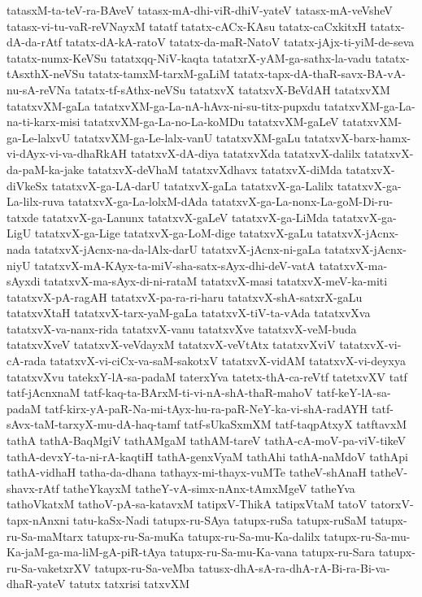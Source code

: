 {tatasxM-ta-teV-ra-BAveV
tatasx-mA-dhi-viR-dhiV-yateV
tatasx-mA-veVsheV
tatasx-vi-tu-vaR-reVNayxM
tatatf
tatatx-cACx-KAsu
tatatx-caCxkitxH
tatatx-dA-da-rAtf
tatatx-dA-kA-ratoV
tatatx-da-maR-NatoV
tatatx-jAjx-ti-yiM-de-seva
tatatx-numx-KeVSu
tatatxqq-NiV-kaqta
tatatxrX-yAM-ga-sathx-la-vadu
tatatx-tAsxthX-neVSu
tatatx-tamxM-tarxM-gaLiM
tatatx-tapx-dA-thaR-savx-BA-vA-nu-sA-reVNa
tatatx-tf-sAthx-neVSu
tatatxvX
tatatxvX-BeVdAH
tatatxvXM
tatatxvXM-gaLa
tatatxvXM-ga-La-nA-hAvx-ni-su-titx-pupxdu
tatatxvXM-ga-La-na-ti-karx-misi
tatatxvXM-ga-La-no-La-koMDu
tatatxvXM-gaLeV
tatatxvXM-ga-Le-lalxvU
tatatxvXM-ga-Le-lalx-vanU
tatatxvXM-gaLu
tatatxvX-barx-hamx-vi-dAyx-vi-va-dhaRkAH
tatatxvX-dA-diya
tatatxvXda
tatatxvX-dalilx
tatatxvX-da-paM-ka-jake
tatatxvX-deVhaM
tatatxvXdhavx
tatatxvX-diMda
tatatxvX-diVkeSx
tatatxvX-ga-LA-darU
tatatxvX-gaLa
tatatxvX-ga-Lalilx
tatatxvX-ga-La-lilx-ruva
tatatxvX-ga-La-lolxM-dAda
tatatxvX-ga-La-nonx-La-goM-Di-ru-tatxde
tatatxvX-ga-Lanunx
tatatxvX-gaLeV
tatatxvX-ga-LiMda
tatatxvX-ga-LigU
tatatxvX-ga-Lige
tatatxvX-ga-LoM-dige
tatatxvX-gaLu
tatatxvX-jAcnx-nada
tatatxvX-jAcnx-na-da-lAlx-darU
tatatxvX-jAcnx-ni-gaLa
tatatxvX-jAcnx-niyU
tatatxvX-mA-KAyx-ta-miV-sha-satx-sAyx-dhi-deV-vatA
tatatxvX-ma-sAyxdi
tatatxvX-ma-sAyx-di-ni-rataM
tatatxvX-masi
tatatxvX-meV-ka-miti
tatatxvX-pA-ragAH
tatatxvX-pa-ra-ri-haru
tatatxvX-shA-satxrX-gaLu
tatatxvXtaH
tatatxvX-tarx-yaM-gaLa
tatatxvX-tiV-ta-vAda
tatatxvXva
tatatxvX-va-nanx-rida
tatatxvX-vanu
tatatxvXve
tatatxvX-veM-buda
tatatxvXveV
tatatxvX-veVdayxM
tatatxvX-veVtAtx
tatatxvXviV
tatatxvX-vi-cA-rada
tatatxvX-vi-ciCx-va-saM-sakotxV
tatatxvX-vidAM
tatatxvX-vi-deyxya
tatatxvXvu
tatekxY-lA-sa-padaM
taterxYva
tatetx-thA-ca-reVtf
tatetxvXV
tatf
tatf-jAcnxnaM
tatf-kaq-ta-BArxM-ti-vi-nA-shA-thaR-mahoV
tatf-keY-lA-sa-padaM
tatf-kirx-yA-paR-Na-mi-tAyx-hu-ra-paR-NeY-ka-vi-shA-radAYH
tatf-sAvx-taM-tarxyX-mu-dA-haq-tamf
tatf-sUkaSxmXM
tatf-taqpAtxyX
tatftavxM
tathA
tathA-BaqMgiV
tathAMgaM
tathAM-tareV
tathA-cA-moV-pa-viV-tikeV
tathA-devxY-ta-ni-rA-kaqtiH
tathA-genxVyaM
tathAhi
tathA-naMdoV
tathApi
tathA-vidhaH
tatha-da-dhana
tathayx-mi-thayx-vuMTe
tatheV-shAnaH
tatheV-shavx-rAtf
tatheYkayxM
tatheY-vA-simx-nAnx-tAmxMgeV
tatheYva
tathoVkatxM
tathoV-pA-sa-katavxM
tatipxV-ThikA
tatipxVtaM
tatoV
tatorxV-tapx-nAnxni
tatu-kaSx-Nadi
tatupx-ru-SAya
tatupx-ruSa
tatupx-ruSaM
tatupx-ru-Sa-maMtarx
tatupx-ru-Sa-muKa
tatupx-ru-Sa-mu-Ka-dalilx
tatupx-ru-Sa-mu-Ka-jaM-ga-ma-liM-gA-piR-tAya
tatupx-ru-Sa-mu-Ka-vana
tatupx-ru-Sara
tatupx-ru-Sa-vaketxrXV
tatupx-ru-Sa-veMba
tatusx-dhA-sA-ra-dhA-rA-Bi-ra-Bi-va-dhaR-yateV
tatutx
tatxrisi
tatxvXM
}
